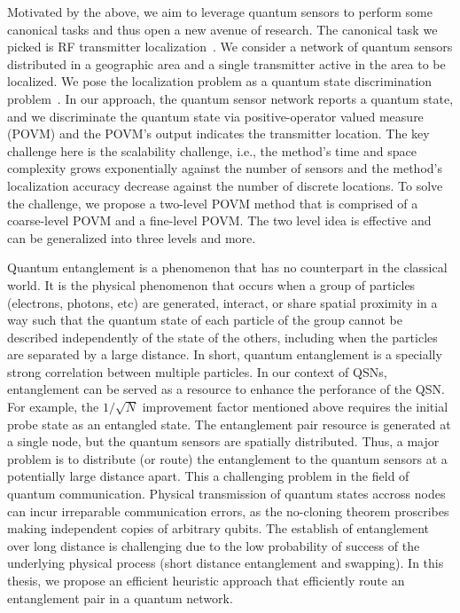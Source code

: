 Motivated by the above, we aim to leverage quantum sensors to perform some canonical tasks and thus open a new avenue of research.
The canonical task we picked is RF transmitter localization~\cite{nsdi13-arraytrack,pmc22-deepmtlpro}.
We consider a network of quantum sensors distributed in a geographic area and a single transmitter active in the area to be localized.
We pose the localization problem as a quantum state discrimination problem~\cite{bergou-review-2007}. 
In our approach, the quantum sensor network reports a quantum state, and we discriminate the quantum state via 
positive-operator valued measure (POVM) and the POVM's output indicates the transmitter location.
The key challenge here is the scalability challenge, i.e., the method's time and space complexity grows exponentially against the
number of sensors and the method's localization accuracy decrease against the number of discrete locations.
To solve the challenge, we propose a two-level POVM method that is comprised of a coarse-level POVM and a fine-level POVM.
The two level idea is effective and can be generalized into three levels and more.

Quantum entanglement is a phenomenon that has no counterpart in the classical world.
It is the physical phenomenon that occurs when a group of particles (electrons, photons, etc) are generated, interact, or share spatial proximity in a way such that
the quantum state of each particle of the group cannot be described independently of the state of the others, including when the particles
are separated by a large distance.
In short, quantum entanglement is a specially strong correlation between multiple particles.
In our context of QSNs, entanglement can be served as a resource to enhance the perforance of the QSN.
For example, the $1 / \sqrt{N}$ improvement factor mentioned above requires the initial probe state as an entangled state.
The entanglement pair resource is generated at a single node, but the quantum sensors are spatially distributed.
Thus, a major problem is to distribute (or route) the entanglement to the quantum sensors at a potentially large distance apart.
This a challenging problem in the field of quantum communication.
Physical transmission of quantum states accross nodes can incur irreparable communication errors, as the no-cloning theorem proscribes
making independent copies of arbitrary qubits.
The establish of entanglement over long distance is challenging due to the low probability of success of the underlying physical process
(short distance entanglement and swapping).
In this thesis, we propose an efficient heuristic approach that efficiently route an entanglement pair in a quantum network.


